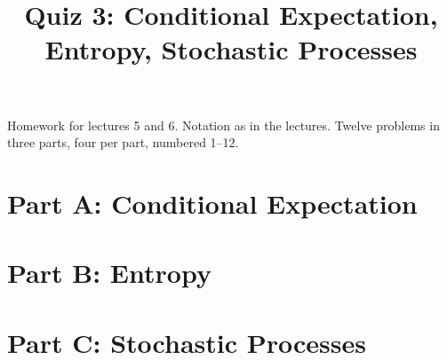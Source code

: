 \documentclass[11pt,a4paper]{article}
\title{Quiz 3: Conditional Expectation, Entropy, Stochastic Processes}\author{}\date{}
\begin{document}
\maketitle
\noindent Homework for lectures 5 and 6. Notation as in the lectures. Twelve problems in three parts, four per part, numbered 1--12.
\section*{Part A: Conditional Expectation}

\section*{Part B: Entropy}

\section*{Part C: Stochastic Processes}

\end{document}
